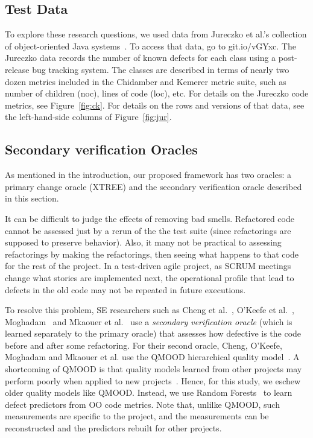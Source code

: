 \documentclass[twocolumn,5p]{elsarticle}
\newcommand{\fig}[1]{Figure~\ref{fig:#1}}
\theoremstyle{break}
\begin{document}
\begin{itemize}
\subsection{Test Data}\label{sect:tesd}

To explore these research questions,
we used data from
Jureczko et al.'s collection of object-oriented Java systems~\cite{jureczko10}. To access that data, go to   git.io/vGYxc.
The Jureczko data records the number of known defects for each class using a post-release bug tracking system. The classes are described in terms of nearly two dozen metrics included in the Chidamber and Kemerer metric suite, such as number of children (noc), lines of code (loc), etc. For details on the Jureczko code
metrics, see  \fig{ck}. For details on the rows and versions
of that data, see the left-hand-side columns of \fig{jur}.



 
\subsection{Secondary verification Oracles}
\label{sect:eval}

As mentioned in the introduction, our proposed framework has two oracles:
a primary change oracle (XTREE) and the secondary verification oracle described in this section.

It can be difficult  to judge the  effects of removing bad smells.
Refactored code cannot be assessed just by a rerun of the the test
suite (since refactorings are supposed to preserve behavior). 
Also, it many not be practical
 to assessing refactorings by making the
refactorings,  then seeing what happens to that code for the rest
of the project. In a test-driven agile project, as
SCRUM meetings change what stories are implemented next,
the operational profile that lead to defects in the old
code may not be repeated in future executions. 

To resolve this  problem, SE researchers such as 
Cheng et al.~\cite{Cheng10}, O'Keefe et al.~\cite{OKeeffe08,OKeeffe07},
Moghadam~\cite{Moghadam2011} and Mkaouer et al.~\cite{Mkaouer14}
use a {\em secondary verification oracle} (which is learned separately
to the primary oracle) that   assesses
how defective is the code before and after some
refactoring. 
For their second oracle,
 Cheng, O'Keefe, Moghadam and  Mkaouer et al. use the QMOOD hierarchical
quality model~\cite{Bansiya02}.
A shortcoming of QMOOD
is that quality models learned from other projects
may perform poorly when applied to new projects~\cite{localvsglobal}.
Hence, for this study, we  eschew
older quality models like QMOOD. Instead, we use
Random Forests~\cite{Breiman2001} to learn defect predictors
from OO code metrics.
Note that, unlilke QMOOD, such measurements 
  are specific to the project, and the measurements can be reconstructed and the predictors rebuilt for other projects.
 

\end{itemize}
\end{document}

